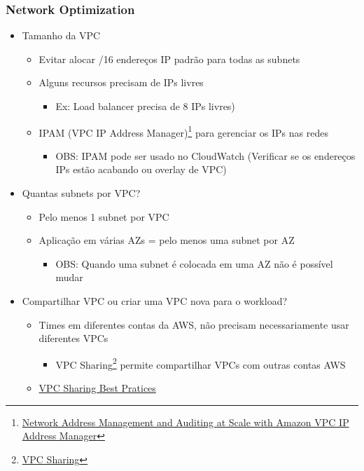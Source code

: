 \begin{frame}[allowframebreaks]
	\frametitle{Network Optimization}
	\begin{itemize}
		\item Tamanho da VPC
			\begin{itemize}
				\item Evitar alocar /16 endereços IP padrão para todas as subnets
				\item Alguns recursos precisam de IPs livres 
					\begin{itemize}
						\item Ex: Load balancer precisa de 8 IPs livres)
					\end{itemize}
				\item IPAM (VPC IP Address Manager)\footnote{\href{https://aws.amazon.com/blogs/aws/network-address-management-and-auditing-at-scale-with-amazon-vpc-ip-address-manager/}{Network Address Management and Auditing at Scale with Amazon VPC IP Address Manager}} para gerenciar os IPs nas redes
					\begin{itemize}
						\item OBS: IPAM pode ser usado no CloudWatch (Verificar se os endereços IPs estão acabando ou overlay de VPC)
					\end{itemize}
			\end{itemize}
		\framebreak
		\item Quantas subnets por VPC?
			\begin{itemize}
				\item Pelo menos 1 subnet por VPC
				\item Aplicação em várias AZs = pelo menos uma subnet por AZ
					\begin{itemize}
						\item OBS: Quando uma subnet é colocada em uma AZ não é possível mudar
					\end{itemize}
			\end{itemize}
		\item Compartilhar VPC ou criar uma VPC nova para o workload?
			\begin{itemize}
				\item Times em diferentes contas da AWS, não precisam necessariamente usar diferentes VPCs
					\begin{itemize}
						\item VPC Sharing\footnote{\href{https://aws.amazon.com/blogs/networking-and-content-delivery/vpc-sharing-a-new-approach-to-multiple-accounts-and-vpc-management/}{VPC Sharing}} permite compartilhar VPCs com outras contas AWS
					\end{itemize}
				\item \href{https://aws.amazon.com/blogs/networking-and-content-delivery/vpc-sharing-key-considerations-and-best-practices/}{VPC Sharing Best Pratices}
			\end{itemize}
	\end{itemize}
\end{frame}

